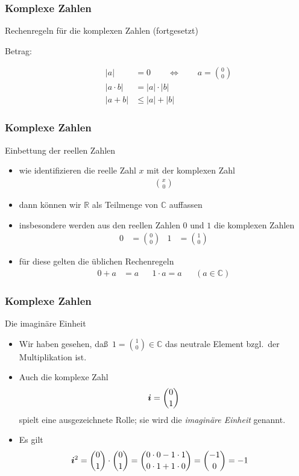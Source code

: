 \documentclass{beamer}
\def\vec#1{\mathchoice{\mbox{\boldmath$\displaystyle#1$}}
{\mbox{\boldmath$\textstyle#1$}}
{\mbox{\boldmath$\scriptstyle#1$}}
{\mbox{\boldmath$\scriptscriptstyle#1$}}}
\renewcommand{\emph}[1]{{\textcolor{solarizedRed}{\itshape #1}}}
\newcommand\ii{\vec i}
\newcommand\RR{\mathbb R}
\newcommand\CC{\mathbb C}
\renewcommand{\ae}{\"a}
\renewcommand{\oe}{\"o}
\newcommand{\ue}{\"u}
\newcommand{\mytitle}{Komplexe Zahlen}
\begin{document}
\begin{frame}\frametitle{\mytitle}
	\begin{block}{Rechenregeln f\ue r die komplexen Zahlen (fortgesetzt)}
		\begin{description}
			\item[Betrag:] 
				\begin{align*}
					|a|&=0\qquad\Leftrightarrow\qquad a=\binom00\\
					|a\cdot b|&=|a|\cdot|b|\\
					|a+b|&\leq|a|+|b|
				\end{align*}
		\end{description}
	\end{block}
\end{frame}

\begin{frame}\frametitle{\mytitle}
	\begin{block}{Einbettung der reellen Zahlen}
		\begin{itemize}
			\item wie \alert{identifizieren} die reelle Zahl $x$ mit der komplexen Zahl
				\begin{align*}
				\binom x0
				\end{align*}
			\item dann k\oe nnen wir $\RR$ als Teilmenge von $\CC$ auffassen
			\item insbesondere werden aus den reellen Zahlen $0$ und $1$ die komplexen Zahlen
				\begin{align*}
					0&=\binom00&1&=\binom10
				\end{align*}
			\item f\ue r diese gelten die \ue blichen Rechenregeln
				\begin{align*}
					0+a&=a&&1\cdot a=a&&(a\in\CC)
				\end{align*}
		\end{itemize}
	\end{block}
\end{frame}

\begin{frame}\frametitle{\mytitle}
	\begin{block}{Die imagin\ae re Einheit}
		\begin{itemize}
			\item Wir haben gesehen, da\ss\ $1=\binom10\in\CC$ das neutrale Element bzgl.\ der Multiplikation ist.
			\item Auch die komplexe Zahl
				\begin{align*}
				\ii=\binom01
				\end{align*}
				spielt eine ausgezeichnete Rolle; sie wird die \emph{imagin\ae re Einheit} genannt.
			\item Es gilt
				\begin{align*}
					\ii^2&=\binom01\cdot\binom01=\binom{0\cdot0-1\cdot1}{0\cdot1+1\cdot0}=\binom{-1}0=-1
				\end{align*}
		\end{itemize}
	\end{block}
\end{frame}
\end{document}
